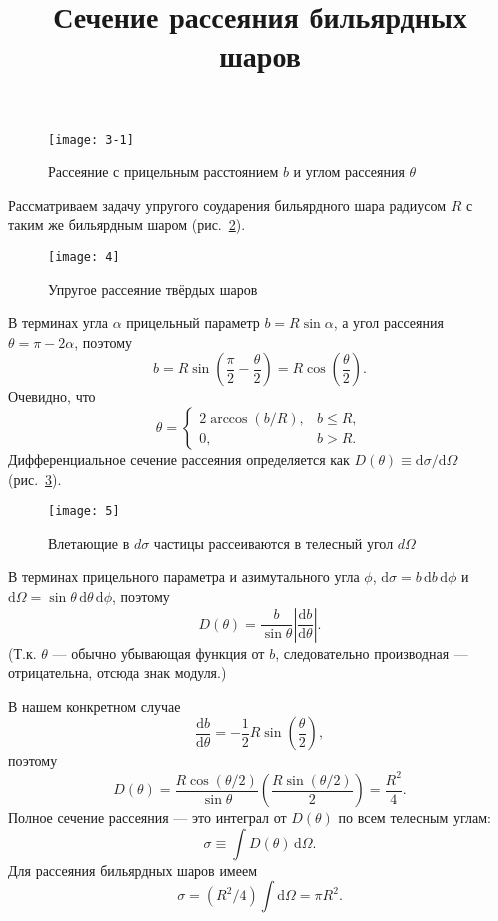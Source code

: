 \documentclass[a4paper, 14pt]{extarticle}
\title{Сечение рассеяния бильярдных шаров}
\begin{document}
	\maketitle
\begin{figure}[htpb]
	\centering
	\texttt{[image: 3-1]}
	\caption{Рассеяние с прицельным расстоянием $b$ и углом рассеяния $\theta$}
	\label{fig:3-1}
\end{figure}
Рассматриваем задачу упругого соударения бильярдного шара радиусом
$R$ с таким же бильярдным шаром (рис.~\ref{fig:4}).
\begin{figure}[htpb]
	\centering
	\texttt{[image: 4]}
	\caption{Упругое рассеяние твёрдых шаров}
	\label{fig:4}
\end{figure}
В
терминах угла $\alpha$ прицельный параметр $b=R \sin \alpha$,
а угол рассеяния $\theta=\pi-2\alpha$, поэтому
\[
	b=R \sin \left( \frac{\pi}{2}-\frac{\theta}{2} \right) =R \cos \left( \frac{\theta}{2} \right) 
.\] 
Очевидно, что
\[
\theta= \begin{cases}
	2 \arccos \left(b /R\right),& b\le R,\\
	0,& b>R.
\end{cases}
\] 
Дифференциальное сечение
рассеяния определяется как $D(\theta)\equiv \mathrm{d} \sigma/\mathrm{d} \Omega$ (рис.~\ref{fig:5}). 
\begin{figure}[htpb]
	\centering
	\texttt{[image: 5]}
	\caption{Влетающие в $d\sigma$ частицы рассеиваются в телесный угол $d\Omega$}
	\label{fig:5}
\end{figure}
В терминах
прицельного параметра и азимутального угла $\phi$,
$\mathrm{d} \sigma= b \, \mathrm{d} b\, \mathrm{d} \phi$ и
$\mathrm{d} \Omega=\sin \theta\, \mathrm{d} \theta\, \mathrm{d} \phi$, поэтому
\[
	D(\theta)= \frac{b}{\sin \theta} \left| 
	\frac{\mathrm{d} b}{\mathrm{d} \theta}\right| 
.\] 
(Т.\:к. $\theta$ --- обычно убывающая функция от $b$,
следовательно производная --- отрицательна, отсюда
знак модуля.)

В нашем конкретном случае
\[
\frac{\mathrm{d} b}{\mathrm{d} \theta}=-\frac{1}{2}
R \sin \left( \frac{\theta}{2} \right) ,
\]
поэтому
\[
	D(\theta)=\frac{R \cos (\theta /2)}{\sin \theta}
	\left( \frac{R \sin (\theta /2)}{2} \right) =
	\frac{R^2}{4}
.\] 
Полное сечение рассеяния --- это интеграл от $D(\theta)$ 
по всем телесным углам:
\[
	\sigma \equiv \int D(\theta)\, \mathrm{d} \Omega
.\] 
Для рассеяния бильярдных шаров имеем
\[
	\sigma= \left( R^2 /4 \right) \int \mathrm{d} \Omega=\pi R^2
.\] 
\end{document}
